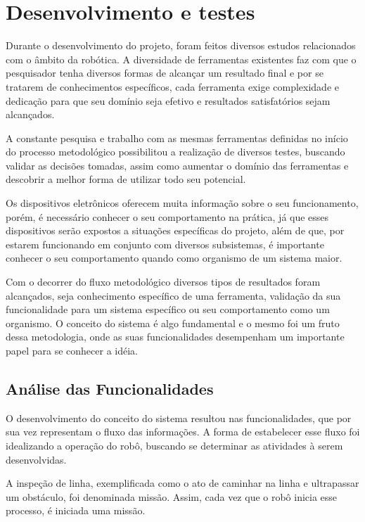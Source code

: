 \chapter{Desenvolvimento e testes}
\label{chap:desen_test}
Durante o desenvolvimento do projeto, foram feitos diversos estudos relacionados com o âmbito da robótica. A diversidade de ferramentas existentes faz com que o pesquisador tenha diversos formas de alcançar um resultado final e por se tratarem de conhecimentos específicos, cada ferramenta exige complexidade e dedicação para que seu domínio seja efetivo e resultados satisfatórios sejam alcançados.

A constante pesquisa e trabalho com as mesmas ferramentas definidas no início do processo metodológico possibilitou a realização de diversos testes, buscando validar as decisões tomadas, assim como aumentar o domínio das ferramentas e descobrir a melhor forma de utilizar todo seu potencial.

Os dispositivos eletrônicos oferecem muita informação sobre o seu funcionamento, porém, é necessário conhecer o seu comportamento na prática, já que esses dispositivos serão expostos a situações específicas do projeto, além de que, por estarem funcionando em conjunto com diversos subsistemas, é importante conhecer o seu comportamento quando como organismo de um sistema maior.

Com o decorrer do fluxo metodológico diversos tipos de resultados foram alcançados, seja conhecimento específico de uma ferramenta, validação da sua funcionalidade para um sistema específico ou seu comportamento como um organismo.  O conceito do sistema é algo fundamental e o mesmo foi um fruto dessa metodologia, onde as suas funcionalidades desempenham um importante papel para se conhecer a idéia.

\section{Análise das Funcionalidades}
\label{sec:analise_func}
O desenvolvimento do conceito do sistema resultou nas funcionalidades, que por sua vez representam o fluxo das informações. A forma de estabelecer esse fluxo foi idealizando a operação do robô, buscando se determinar as atividades à serem desenvolvidas.

A inspeção de linha, exemplificada como o ato de caminhar na linha e ultrapassar um obstáculo, foi denominada missão. Assim, cada vez que o robô inicia esse processo, é iniciada uma missão.


